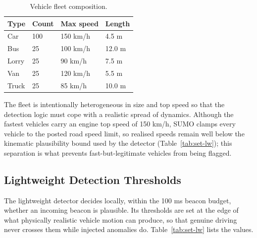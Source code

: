 \documentclass[12pt, a4paper]{report}
\begin{document}
\begin{table}[H]
\centering
\caption{Vehicle fleet composition.}
\label{tab:set-fleet}
\begin{tabular}{|l|l|l|l|}
\hline
\textbf{Type} & \textbf{Count} & \textbf{Max speed} & \textbf{Length} \\
\hline
Car   & 100 & 150 km/h & 4.5 m \\
\hline
Bus   & 25  & 100 km/h & 12.0 m \\
\hline
Lorry & 25  & 90 km/h  & 7.5 m \\
\hline
Van   & 25  & 120 km/h & 5.5 m \\
\hline
Truck & 25  & 85 km/h  & 10.0 m \\
\hline
\end{tabular}
\end{table}

The fleet is intentionally heterogeneous in size and top speed so that the
detection logic must cope with a realistic spread of dynamics. Although the
fastest vehicles carry an engine top speed of 150 km/h, SUMO clamps every
vehicle to the posted road speed limit, so realised speeds remain well below the
kinematic plausibility bound used by the detector (Table~\ref{tab:set-lw}); this
separation is what prevents fast-but-legitimate vehicles from being flagged.

\subsection{Lightweight Detection Thresholds}

The lightweight detector decides locally, within the 100 ms beacon budget,
whether an incoming beacon is plausible. Its thresholds are set at the edge of
what physically realistic vehicle motion can produce, so that genuine driving
never crosses them while injected anomalies do. Table~\ref{tab:set-lw} lists the
values.
\end{document}
